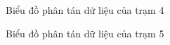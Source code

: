 \documentclass[a4paper]{article}
\begin{document}
\begin{figure}[H]
\caption{Biểu đồ phân tán dữ liệu của trạm 4}
\end{figure}

\begin{figure}[H]
\caption{Biểu đồ phân tán dữ liệu của trạm 5}
\end{figure}
\end{document}
